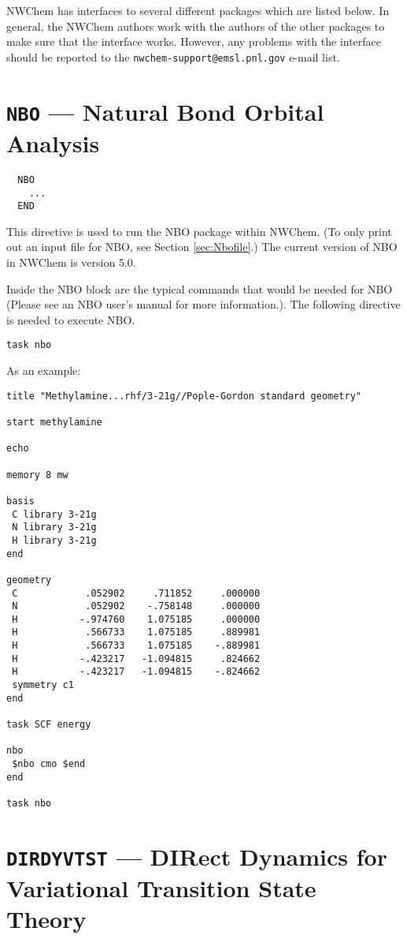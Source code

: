 \label{sec:interface}

NWChem has interfaces to several different packages which are listed below.
In general, the NWChem authors work with the authors of the other packages
to make sure that the interface works.  However, any problems with the 
interface should be reported to the
{\tt nwchem-support@emsl.pnl.gov} e-mail list.

\section{{\tt NBO} --- Natural Bond Orbital Analysis}
\label{sec:nbo}
\begin{verbatim}
  NBO
    ...
  END
\end{verbatim}

This directive is used to run the NBO package within NWChem.  (To only print
out an input file for NBO, see Section \ref{sec:Nbofile}.)  The current
version of NBO in NWChem is version 5.0.

Inside the NBO block are the typical commands that would be needed for NBO
(Please see an NBO user's manual for more information.).  The following
directive is needed to execute NBO.
\begin{verbatim}
task nbo
\end{verbatim}
As an example:

\begin{verbatim}
title "Methylamine...rhf/3-21g//Pople-Gordon standard geometry"

start methylamine

echo

memory 8 mw

basis
 C library 3-21g
 N library 3-21g
 H library 3-21g
end

geometry
 C            .052902     .711852     .000000
 N            .052902    -.758148     .000000
 H           -.974760    1.075185     .000000
 H            .566733    1.075185     .889981
 H            .566733    1.075185    -.889981
 H           -.423217   -1.094815     .824662
 H           -.423217   -1.094815    -.824662
 symmetry c1
end

task SCF energy

nbo
 $nbo cmo $end
end

task nbo 

\end{verbatim}

\section{{\tt DIRDYVTST} --- DIRect Dynamics for Variational Transition State Theory}
\label{sec:dirdyvtst}

